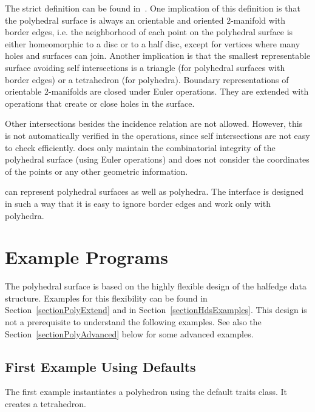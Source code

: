 The strict definition can be found in~\cite{k-ugpdd-99}. One
implication of this definition is that the polyhedral surface is
always an orientable and oriented 2-manifold with border edges, i.e.
the neighborhood of each point on the polyhedral surface is either
homeomorphic to a disc or to a half disc, except for vertices where
many holes and surfaces can join. Another implication is that the
smallest representable surface avoiding self intersections is a
triangle (for polyhedral surfaces with border edges) or a tetrahedron
(for polyhedra). Boundary representations of orientable 2-manifolds
are closed under Euler operations. They are extended with operations
that create or close holes in the surface.

Other intersections besides the incidence relation are not allowed.
However, this is not automatically verified in the operations, since
self intersections are not easy to check
efficiently.  does only maintain the
combinatorial integrity of the polyhedral surface (using Euler
operations) and does not consider the coordinates of the points or any
other geometric information.

 can represent polyhedral surfaces as
well as polyhedra. The interface is designed in such a way that it is
easy to ignore border edges and work only with polyhedra.


\section{Example Programs}
\label{sectionPolyExamples}

The polyhedral surface is based on the highly flexible design of the
halfedge data structure. Examples for this flexibility can be found in
Section~\ref{sectionPolyExtend} and in Section~\ref{sectionHdsExamples}. 
This design is not a prerequisite to understand the following examples.
See also the Section~\ref{sectionPolyAdvanced} below for some advanced 
examples.

\subsection{First Example Using Defaults}

The first example instantiates a polyhedron using the default traits
class. It creates a tetrahedron.

